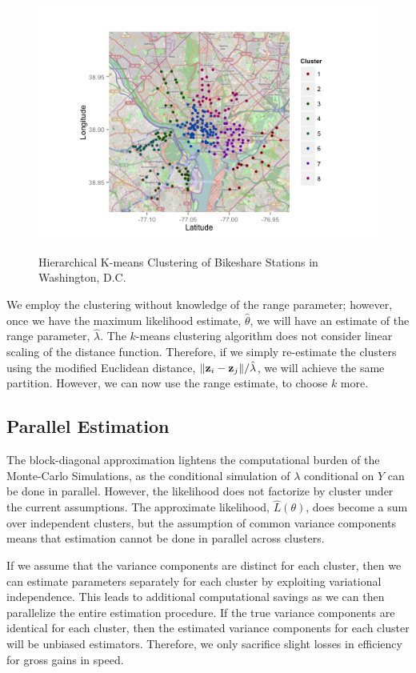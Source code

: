 \documentclass{acm_proc_article-sp}
\begin{document}
\begin{figure} [!h]
\caption{Hierarchical K-means Clustering of Bikeshare Stations in Washington, D.C.}
\centering
\includegraphics[scale = 0.5]{cluster_map.png}
\label{fig:cluster_map}
\end{figure}

We employ the clustering without knowledge of the range parameter; however, once we have the maximum likelihood estimate, $\hat{\theta}$, we will have an estimate of the range parameter, $\hat{\lambda}$.  The $k$-means clustering algorithm does not consider linear scaling of the distance function.  Therefore, if we simply re-estimate the clusters using the modified Euclidean distance, $\|{\bf z}_i - {\bf z}_j \| / \hat{\lambda}$, we will achieve the same partition.  However, we can now use the range estimate, to choose $k$ more. 

\subsection{Parallel Estimation}

The block-diagonal approximation lightens the computational burden of the Monte-Carlo Simulations, as the conditional simulation of $\lambda$ conditional on $Y$ can be done in parallel.  However, the likelihood does not factorize by cluster under the current assumptions.  The approximate likelihood, $\hat{L} (\theta)$, does become a sum over independent clusters, but the assumption of common variance components means that estimation cannot be done in parallel across clusters.

If we assume that the variance components are distinct for each cluster, then we can estimate parameters separately for each cluster by exploiting variational independence.  This leads to additional computational savings as we can then parallelize the entire estimation procedure.  If the true variance components are identical for each cluster, then the estimated variance components for each cluster will be unbiased estimators.  Therefore, we only sacrifice slight losses in efficiency for gross gains in speed.  
\end{document}
